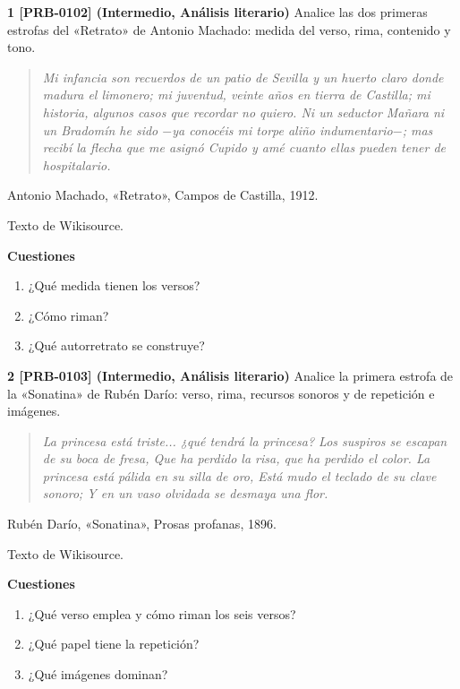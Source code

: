 \documentclass{book}
\begin{document}
\begin{tcolorbox}[title={Ejercicios}, studiumworked, breakable]

\noindent\textbf{1 [PRB-0102] (Intermedio, Análisis literario)}
Analice las dos primeras estrofas del «Retrato» de Antonio Machado: medida del verso, rima, contenido y tono.


\begin{quote}
\itshape Mi infancia son recuerdos de un patio de Sevilla y un huerto claro donde madura el limonero; mi juventud, veinte años en tierra de Castilla; mi historia, algunos casos que recordar no quiero. Ni un seductor Mañara ni un Bradomín he sido \(-\)ya conocéis mi torpe aliño indumentario\(-\); mas recibí la flecha que me asignó Cupido y amé cuanto ellas pueden tener de hospitalario.
\end{quote}
{\noindent\footnotesize Antonio Machado, «Retrato», Campos de Castilla, 1912.\par}
{\noindent\footnotesize Texto de Wikisource.\par}

\noindent\textbf{Cuestiones}
\begin{enumerate}
\item ¿Qué medida tienen los versos?
\item ¿Cómo riman?
\item ¿Qué autorretrato se construye?
\end{enumerate}

\noindent\textbf{2 [PRB-0103] (Intermedio, Análisis literario)}
Analice la primera estrofa de la «Sonatina» de Rubén Darío: verso, rima, recursos sonoros y de repetición e imágenes.


\begin{quote}
\itshape La princesa está triste... ¿qué tendrá la princesa? Los suspiros se escapan de su boca de fresa, Que ha perdido la risa, que ha perdido el color. La princesa está pálida en su silla de oro, Está mudo el teclado de su clave sonoro; Y en un vaso olvidada se desmaya una flor.
\end{quote}
{\noindent\footnotesize Rubén Darío, «Sonatina», Prosas profanas, 1896.\par}
{\noindent\footnotesize Texto de Wikisource.\par}

\noindent\textbf{Cuestiones}
\begin{enumerate}
\item ¿Qué verso emplea y cómo riman los seis versos?
\item ¿Qué papel tiene la repetición?
\item ¿Qué imágenes dominan?
\end{enumerate}


\end{tcolorbox}
\end{document}
